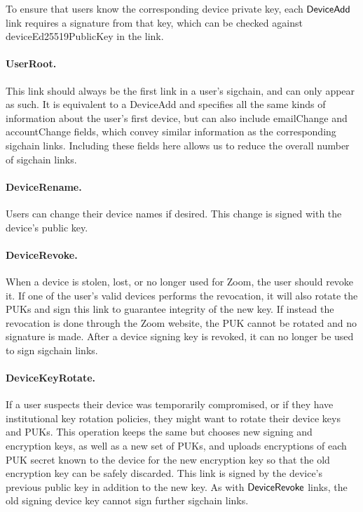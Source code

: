 To ensure that users know the corresponding device private key, each $\mathsf{DeviceAdd}{}$ link requires a
signature from that key, which can be checked against \textsf{deviceEd25519PublicKey} in the link.

\paragraph{UserRoot.} This link should always be the first link in a user's sigchain, and can only
appear as such. It is equivalent to a DeviceAdd and specifies all the same kinds of information
about the user's first device, but can also include \textsf{emailChange} and \textsf{accountChange}
fields, which convey similar information as the corresponding sigchain links. Including these fields
here allows us to reduce the overall number of sigchain links.

\paragraph{DeviceRename.} Users can change their device names if desired. This change is signed with
the device's public key.

\paragraph{DeviceRevoke.} When a device is stolen, lost, or no longer used for Zoom, the user should
revoke it. If one of the user's valid devices performs the revocation, it will also rotate the PUKs
and sign this link to guarantee integrity of the new key. If instead the revocation is done through
the Zoom website, the PUK cannot be rotated and no signature is made. After a device signing key is
revoked, it can no longer be used to sign sigchain links.

\paragraph{DeviceKeyRotate.} If a user suspects their device was temporarily compromised, or if they
have institutional key rotation policies, they might want to rotate their device keys and PUKs. This
operation keeps the same \deviceid but chooses new signing and encryption keys, as well as a new set
of PUKs, and uploads encryptions of each PUK secret known to the device for the new encryption key
so that the old encryption key can be safely discarded. This link is signed by the device's previous
public key in addition to the new key. As with $\mathsf{DeviceRevoke}{}$ links, the old signing device key
cannot sign further sigchain links.

